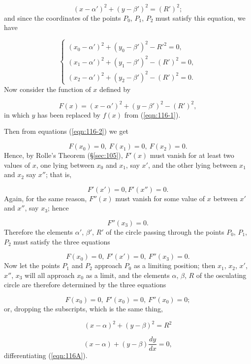 \[
 (x-\alpha')^2 + (y-\beta')^2 = (R')^2;
\]
and since the coordinates of the points $P_0$, $P_1$, $P_2$ 
must satisfy this equation, we have

\begin{equation}
\label{eqn:116-2}
\begin{cases} (x_0 - \alpha')^2 + (y_0 -\beta')^2 - R'^2 = 0, \\ 
(x_1 - \alpha')^2 + (y_1 - \beta')^2 -(R')^2 = 0, \\ 
(x_2 - \alpha')^2 + (y_2 - \beta')^2 -(R')^2 = 0.
\end{cases}
\end{equation}
Now consider the function of $x$ defined by

\[
    F(x) = (x-\alpha')^2 + (y-\beta')^2 - (R')^2,
\]
in which $y$ has been replaced by $f(x)$ from (\ref{eqn:116-1}).

Then from equations (\ref{eqn:116-2}) we get

\[
    F(x_0) = 0,\ F(x_1) = 0,\ F(x_2) = 0.
\]
Hence, by Rolle's Theorem (\S \ref{sec:105}), $F'(x)$ must vanish 
for at least two values of $x$, one lying between $x_0$ and $x_1$, 
say $x'$, and the other lying between $x_1$ and $x_2$ say $x''$; that is,

\[
    F'(x') = 0,F'(x'') = 0.
\]
Again, for the same reason, $F''(x)$ must vanish for some value 
of $x$ between $x'$ and $x''$, say $x_3$; hence

\[
    F''(x_3) = 0.
\]
Therefore the elements $\alpha'$, $\beta'$, $R'$ of the circle 
passing through the points $P_0$, $P_1$, $P_2$ must satisfy the three 
equations

\[
    F(x_0) = 0,\ F'(x') = 0,\ F''(x_3) = 0. 
\]
Now let the points $P_1$ and $P_2$ approach $P_0$ as a limiting 
position; then $x_1$, $x_2$, $x'$, $x''$, $x_3$ will all approach 
$x_0$ as a limit, and the elements $\alpha$, $\beta$, $R$ of the 
osculating circle are therefore determined by the three equations

\[
    F(x_0) = 0,\ F'(x_0) = 0,\ F''(x_0) = 0;
\]
or, dropping the subscripts, which is the same thing,

\begin{equation}
\label{eqn:116A}
(x - \alpha)^2 + (y -\beta)^2 = R^2
\end{equation}

\begin{equation}
\label{eqn:116B}
(x - \alpha) + (y -\beta)\frac{dy}{dx} = 0,
\end{equation}
differentiating (\ref{eqn:116A}).

